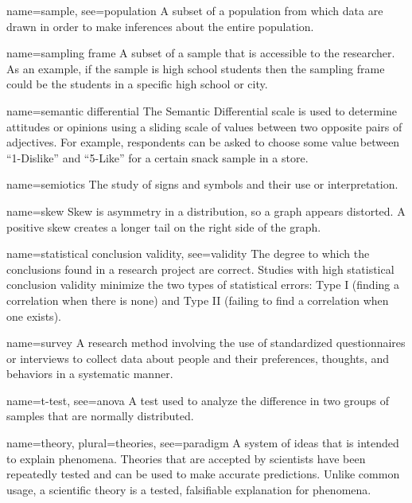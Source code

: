 {name={sample},
	see={population}}
{%
	A subset of a population from which data are drawn in order to make inferences about the entire population.
}

{name={sampling frame}}
{%
	A subset of a sample that is accessible to the researcher. As an example, if the sample is high school students then the sampling frame could be the students in a specific high school or city. 
}

{name={semantic differential}}
{%
	The Semantic Differential scale is used to determine attitudes or opinions using a sliding scale of values between two opposite pairs of adjectives. For example, respondents can be asked to choose some value between ``1-Dislike'' and ``5-Like'' for a certain snack sample in a store.
}

{name={semiotics}}
{%
	The study of signs and symbols and their use or interpretation.
}


{name={skew}}
{%
	Skew is asymmetry in a distribution, so a graph appears distorted. A positive skew creates a longer tail on the right side of the graph.
}

{name={statistical conclusion validity},
	see={validity}}
{%
	The degree to which the conclusions found in a research project are correct. Studies with high statistical conclusion validity minimize the two types of statistical errors: Type I (finding a correlation when there is none) and Type II (failing to find a correlation when one exists). 
}

{name={survey}}
{%
	A research method involving the use of standardized questionnaires or interviews to collect data about people and their preferences, thoughts, and behaviors in a systematic manner. 
}

{name={t-test},
	see={anova}}
{%
	A test used to analyze the difference in two groups of samples that are normally distributed.
}

{name={theory},
	plural={theories},
	see={paradigm}}
{%
	A system of ideas that is intended to explain phenomena. Theories that are accepted by scientists have been repeatedly tested and can be used to make accurate predictions. Unlike common usage, a scientific theory is a tested, falsifiable explanation for phenomena.
}

